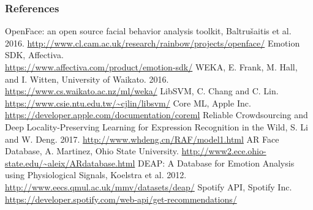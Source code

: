\documentclass[11pt]{article}
\begin{document}
\begin{multicols}{2}
{\subsubsection*{References}
\def\section*#1{}
\begin{thebibliography}{9}
\scriptsize
{}
OpenFace: an open source facial behavior analysis toolkit, Baltru\v{s}aitis et al. 2016.
\url{http://www.cl.cam.ac.uk/research/rainbow/projects/openface/}
Emotion SDK, Affectiva.\\
\url{https://www.affectiva.com/product/emotion-sdk/}
WEKA, E. Frank, M. Hall, and I. Witten, University of Waikato. 2016.\\
\url{https://www.cs.waikato.ac.nz/ml/weka/}
LibSVM, C. Chang and C. Lin.\\
\url{https://www.csie.ntu.edu.tw/~cjlin/libsvm/}
Core ML, Apple Inc.\\
\url{https://developer.apple.com/documentation/coreml}
Reliable Crowdsourcing and Deep Locality-Preserving Learning for Expression Recognition in the Wild, S. Li and W. Deng. 2017.
\url{http://www.whdeng.cn/RAF/model1.html}
AR Face Database, A. Martinez, Ohio State University.
\url{http://www2.ece.ohio-state.edu/~aleix/ARdatabase.html}
DEAP: A Database for Emotion Analysis using Physiological Signals, Koelstra et al. 2012.
\url{http://www.eecs.qmul.ac.uk/mmv/datasets/deap/}
Spotify API, Spotify Inc.
\url{https://developer.spotify.com/web-api/get-recommendations/}
\end{thebibliography}
}

\end{multicols}
\end{document}
